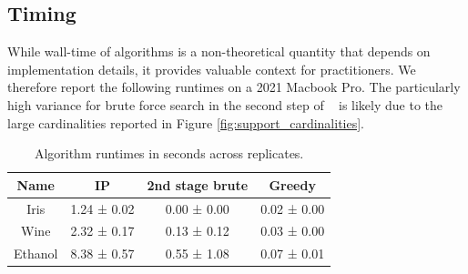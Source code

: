 \newpage

\subsection{Timing}
\label{sec:timing}

While wall-time of algorithms is a non-theoretical quantity that depends on implementation details, it provides valuable context for practitioners.
We therefore report the following runtimes on a 2021 Macbook Pro.
The particularly high variance for brute force search in the second step of \tsip~ is likely due to the large cardinalities reported in Figure \ref{fig:support_cardinalities}.

\begin{table}[H]
\centering
\begin{tabular}{|c|c|c|c|}
\toprule
Name & IP & 2nd stage brute & Greedy \\
\midrule
Iris & 1.24 ± 0.02 & 0.00 ± 0.00 & 0.02 ± 0.00 \\
Wine & 2.32 ± 0.17 & 0.13 ± 0.12 & 0.03 ± 0.00 \\
Ethanol & 8.38 ± 0.57 & 0.55 ± 1.08 & 0.07 ± 0.01 \\
\bottomrule
\end{tabular}
\caption{Algorithm runtimes in seconds across replicates.}
\end{table}